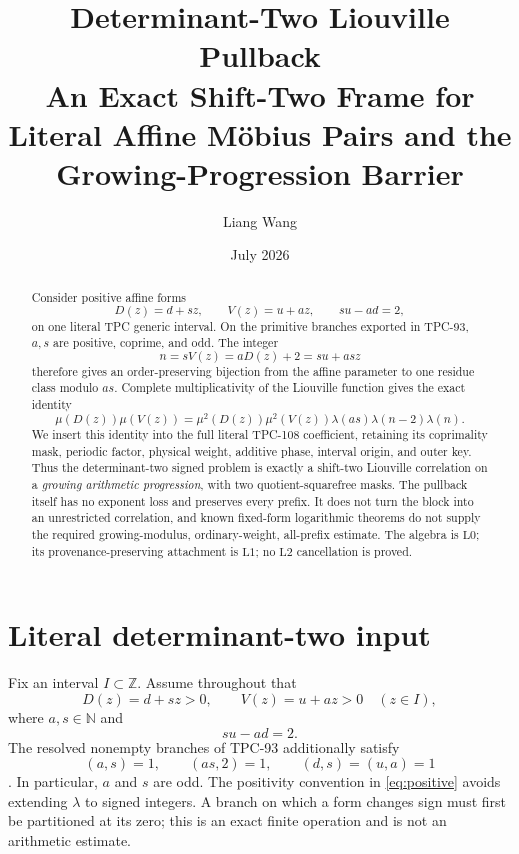 \documentclass[11pt]{article}
\title{\textbf{Determinant-Two Liouville Pullback}\\
\large An Exact Shift-Two Frame for Literal Affine M\"obius Pairs
and the Growing-Progression Barrier}
\author{Liang Wang}
\date{July 2026}
\theoremstyle{definition}
\theoremstyle{remark}
\newcommand{\Lzero}{\mathrm{L0}}
\newcommand{\Lone}{\mathrm{L1}}
\newcommand{\Ltwo}{\mathrm{L2}}
\begin{document}
\maketitle

\begin{abstract}
Consider positive affine forms
\[
 D(z)=d+sz,\qquad V(z)=u+az,\qquad su-ad=2,
\]
on one literal TPC generic interval.  On the primitive branches
exported in TPC-93, \(a,s\) are positive, coprime, and odd.  The
integer
\[
 n=sV(z)=aD(z)+2=su+as z
\]
therefore gives an order-preserving bijection from the affine
parameter to one residue class modulo \(as\).  Complete
multiplicativity of the Liouville function gives the exact identity
\[
 \boxed{\;
 \mu(D(z))\mu(V(z))
 =
 \mu^2(D(z))\mu^2(V(z))\lambda(as)
 \lambda(n-2)\lambda(n).\;}
\]
We insert this identity into the full literal TPC-108 coefficient,
retaining its coprimality mask, periodic factor, physical weight,
additive phase, interval origin, and outer key.  Thus the
determinant-two signed problem is exactly a shift-two Liouville
correlation on a \emph{growing arithmetic progression}, with two
quotient-squarefree masks.  The pullback itself has no exponent loss
and preserves every prefix.  It does not turn the block into an
unrestricted correlation, and known fixed-form logarithmic theorems
do not supply the required growing-modulus, ordinary-weight,
all-prefix estimate.  The algebra is \(\Lzero\); its
provenance-preserving attachment is \(\Lone\); no \(\Ltwo\)
cancellation is proved.
\end{abstract}

\section{Literal determinant-two input}

Fix an interval \(I\subset\mathbb Z\).  Assume throughout that
\begin{equation}
 D(z)=d+sz>0,\qquad V(z)=u+az>0
 \quad(z\in I),
\label{eq:positive}
\end{equation}
where \(a,s\in\mathbb N\) and
\begin{equation}
 su-ad=2.
\label{eq:det-two}
\end{equation}
The resolved nonempty branches of TPC-93 additionally satisfy
\begin{equation}
 (a,s)=1,\qquad (as,2)=1,\qquad (d,s)=(u,a)=1
\label{eq:primitive}
\end{equation}
\citep{WangTPC93}.  In particular, \(a\) and \(s\) are odd.
The positivity convention in \eqref{eq:positive} avoids extending
\(\lambda\) to signed integers.  A branch on which a form changes
sign must first be partitioned at its zero; this is an exact finite
operation and is not an arithmetic estimate.
\end{document}
